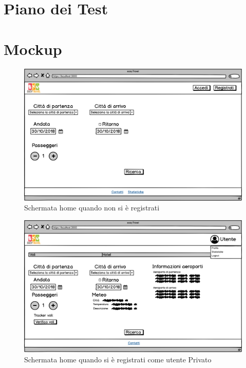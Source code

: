 \documentclass[11pt]{article}
\begin{document}
\section{Piano dei Test}

\pagebreak


\section{Mockup}
\begin{figure}[!ht]
	\includegraphics[width=1\textwidth]{./Mockup/Home-non-registrato} %
	\caption{Schermata home quando non si è registrati}
	\label{fig:homenotreg}
\end{figure}

\begin{figure}[!ht]
	\includegraphics[width=1\textwidth]{./Mockup/Voli-user} %
	\caption{Schermata home quando si è registrati come utente Privato}
	\label{fig:homeuser}
\end{figure}
\end{document}
